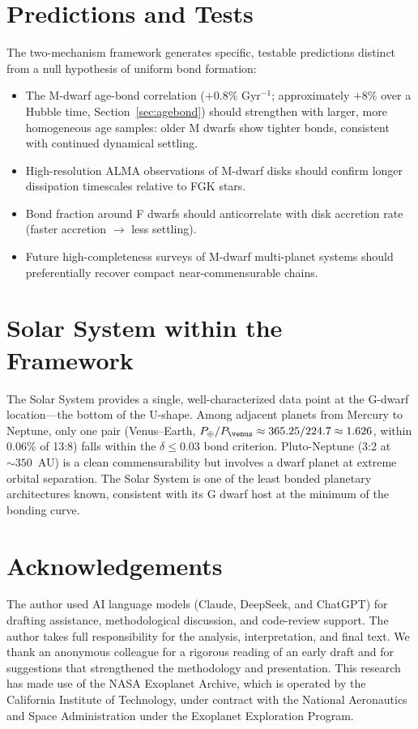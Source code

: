 \documentclass[twocolumn,usenatbib]{mnras}
\begin{document}
\section{Predictions and Tests}

The two-mechanism framework generates specific, testable predictions distinct
from a null hypothesis of uniform bond formation:
\begin{itemize}
  \item The M-dwarf age-bond correlation ($+0.8\%$ Gyr$^{-1}$; approximately
        $+8\%$ over a Hubble time,
        Section~\ref{sec:agebond}) should strengthen with larger, more
        homogeneous age samples: older M dwarfs show tighter bonds, consistent
        with continued dynamical settling.
  \item High-resolution ALMA observations of M-dwarf disks should confirm
        longer dissipation timescales relative to FGK stars.
  \item Bond fraction around F dwarfs should anticorrelate with disk accretion
        rate (faster accretion $\rightarrow$ less settling).
  \item Future high-completeness surveys of M-dwarf multi-planet systems should
        preferentially recover compact near-commensurable chains.
\end{itemize}

\section{Solar System within the Framework}

The Solar System provides a single, well-characterized data point at the
G-dwarf location---the bottom of the U-shape. Among adjacent planets from
Mercury to Neptune, only one pair (Venus--Earth, $P_\oplus/P_\venus \approx
365.25/224.7 \approx 1.626$, within 0.06\% of 13:8) falls
within the $\delta \leq 0.03$ bond criterion. Pluto-Neptune (3:2 at $\sim
350$~AU) is a clean commensurability but involves a dwarf planet at extreme
orbital separation. The Solar System is one of the least bonded planetary
architectures known, consistent with its G dwarf host at the minimum of the
bonding curve.

\section{Acknowledgements}

The author used AI language models (Claude, DeepSeek, and ChatGPT) for
drafting assistance, methodological discussion, and code-review support.
The author takes full responsibility for the analysis, interpretation, and
final text. We thank an anonymous colleague for a rigorous reading of an early
draft and for suggestions that strengthened the methodology and presentation.
This research has made use of the NASA Exoplanet Archive, which is operated by
the California Institute of Technology, under contract with the National
Aeronautics and Space Administration under the Exoplanet Exploration Program.
\end{document}
